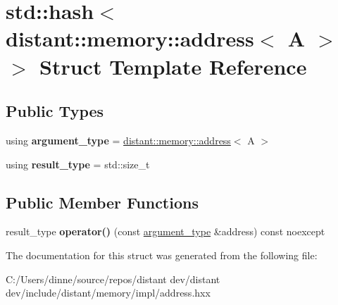 \hypertarget{structstd_1_1hash_3_01distant_1_1memory_1_1address_3_01_a_01_4_01_4}{}\section{std\+:\+:hash$<$ distant\+:\+:memory\+:\+:address$<$ A $>$ $>$ Struct Template Reference}
\label{structstd_1_1hash_3_01distant_1_1memory_1_1address_3_01_a_01_4_01_4}
\subsection*{Public Types}
\begin{DoxyCompactItemize}
\item 
\mbox{\label{structstd_1_1hash_3_01distant_1_1memory_1_1address_3_01_a_01_4_01_4_acc28636c44fb1d5eeddb61942f3bdbcf}} 
using {\bfseries argument\+\_\+type} = \mbox{\hyperlink{classdistant_1_1memory_1_1address}{distant\+::memory\+::address}}$<$ A $>$
\item 
\mbox{\label{structstd_1_1hash_3_01distant_1_1memory_1_1address_3_01_a_01_4_01_4_a8dee9ef0ee1f2ac63756bf24b180ed7e}} 
using {\bfseries result\+\_\+type} = std\+::size\+\_\+t
\end{DoxyCompactItemize}
\subsection*{Public Member Functions}
\begin{DoxyCompactItemize}
\item 
\mbox{\label{structstd_1_1hash_3_01distant_1_1memory_1_1address_3_01_a_01_4_01_4_ae8e520d90f9d08b949333c2908a70118}} 
result\+\_\+type {\bfseries operator()} (const \mbox{\hyperlink{classdistant_1_1memory_1_1address}{argument\+\_\+type}} \&address) const noexcept
\end{DoxyCompactItemize}


The documentation for this struct was generated from the following file\+:\begin{DoxyCompactItemize}
\item 
C\+:/\+Users/dinne/source/repos/distant dev/distant dev/include/distant/memory/impl/address.\+hxx\end{DoxyCompactItemize}
